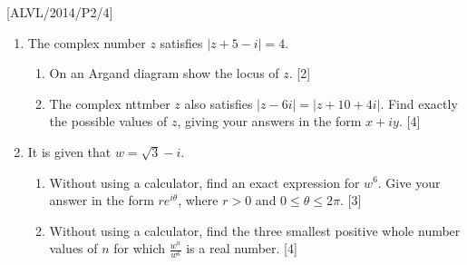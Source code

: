 \item {[}ALVL/2014/P2/4{]}
\begin{enumerate}
\item The complex number $z$ satisfies $\left|z+5-i\right|=4$.
\begin{enumerate}
\item On an Argand diagram show the locus of $z$. \hfill{}{[}2{]}
\item The complex nttmber $z$ also satisfies $\left|z-6i\right|=\left|z+10+4i\right|$.
Find exactly the possible values of $z$, giving your answers in the
form $x+iy$. \hfill{}{[}4{]}
\end{enumerate}
\item It is given that $w=\sqrt{3}-i$. 
\begin{enumerate}
\item Without using a calculator, find an exact expression for $w^{6}$.
Give your answer in the form $re^{i\theta}$, where $r>0$ and $0\leq\theta\leq2\pi$.
\hfill{}{[}3{]}
\item Without using a calculator, find the three smallest positive whole
number values of $n$ for which $\frac{w^{n}}{w^{6}}$ is a real number.
\hfill{}{[}4{]}
\end{enumerate}
\end{enumerate}
